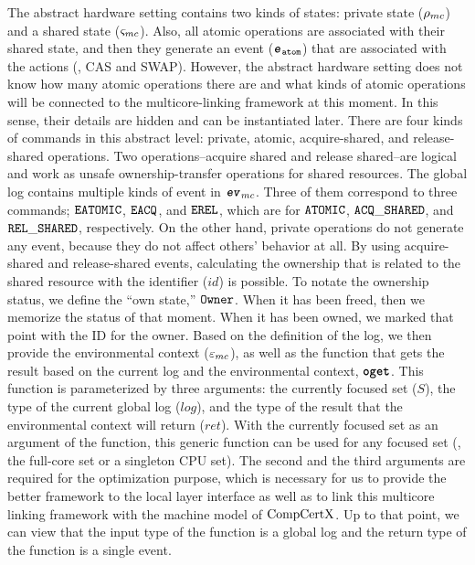 The abstract hardware setting contains two kinds of states: private state (${\rho_{mc}}$) and a shared state (${\varsigma_{mc}}$). 
Also, all atomic operations are associated with their shared state, and then they generate an event (${{\mathrm{\texttt{\textbf{\textit{e}}}}}_{{\mathrm{\texttt{atom}}}}}$) that 
are associated with the actions (\eg, CAS and SWAP).
However, the abstract hardware setting 
does not know how many atomic operations there are and what kinds of atomic operations 
will be connected to the multicore-linking framework at this moment.
In this sense, their details are hidden and can be instantiated later. 
There are four kinds of commands in this abstract level: private, atomic, acquire-shared, and release-shared operations. 
Two operations--acquire shared and release shared--are logical and work as  unsafe ownership-transfer operations for shared resources. 
The global log contains multiple kinds of event in ${{\mathrm{\texttt{\textbf{\textit{ev}}}}}_{mc}}$. 
Three of them correspond to three commands; ${{\mathrm{\texttt{EATOMIC}}}}$, ${{\mathrm{\texttt{EACQ}}}}$, and ${{\mathrm{\texttt{EREL}}}}$, which are for ${{\mathrm{\texttt{ATOMIC}}}}$, ${{\mathrm{\texttt{ACQ}}}\_{\mathrm{\texttt{SHARED}}}}$, and ${{\mathrm{\texttt{REL}}}\_{\mathrm{\texttt{SHARED}}}}$, respectively. 
On the other hand, private operations do not generate any event, because they do not affect others' behavior at all. 
By using acquire-shared and release-shared events,
calculating the ownership that is related to the shared resource with the identifier ($id$) is possible. 
To notate the ownership status, we define the ``own state,'' ${{\mathrm{\texttt{Owner}}}}$.
When it has been freed, then we memorize the status of that moment. 
When it has been owned, we marked that point with the ID for the owner. 
Based on the definition of the log, 
we then provide the environmental context (${\varepsilon_{mc}}$),
as well as the function that gets the result based on the current log and the environmental context, ${{\mathrm{\texttt{\textbf{oget}}}}}$.
This function is parameterized by three arguments:
the currently focused set ($S$), the type of the current global log ($log$), and the type of 
the result that the environmental context will return ($ret$). 
With  the currently focused set as an argument of the function,  this generic function can be used
for any focused set (\eg, the full-core set or a singleton CPU set).
The second and the third arguments are required for the optimization purpose, which is 
necessary for us to provide the better framework to the local layer interface as 
well as to link this multicore linking framework with the machine model of $\mathrm{CompCertX}$. 
Up to that point, we can view that the input type of the function is a global log and the return type of the function is a single event.

